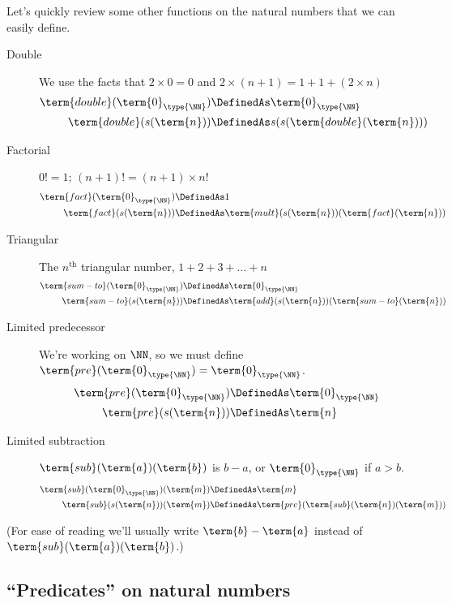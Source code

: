 Let's quickly review some other functions on the natural numbers that we can easily define.
\begin{description}
\item[Double] We use the facts that $2\times 0 = 0$ and $2\times (n+1) = 1+1+(2\times n)$
\begin{align*}
\term{double}(\term{0}_{\type{\NN}}) 
&\DefinedAs 
\term{0}_{\type{\NN}}
\\
\term{double}(s(\term{n})) 
&\DefinedAs
s(s(\term{double}(\term{n})))
\end{align*}
%
\item[Factorial]  $0! = 1$; $(n+1)! = (n+1) \times n!$
\begin{align*}
\term{fact}(\term{0}_{\type{\NN}}) 
&\DefinedAs 
1\\
\term{fact}(s(\term{n})) 
&\DefinedAs
\term{mult}(s(\term{n}))(\term{fact}(\term{n}))
\end{align*}
%
\item[Triangular] The $n^{\mbox{th}}$ triangular number, $1+2+3+ \ldots +n$
\begin{align*}
\term{sum-to}(\term{0}_{\type{\NN}}) 
&\DefinedAs 
\term{0}_{\type{\NN}}
\\
\term{sum-to}(s(\term{n})) 
&\DefinedAs
\term{add}(s(\term{n}))(\term{sum-to}(\term{n}))
\end{align*}
%



\item[Limited predecessor]  We're working on $\NN$, so we must define $\term{pre}(\term{0}_{\type{\NN}})  = \term{0}_{\type{\NN}}$.
 \begin{align*}
\term{pre}(\term{0}_{\type{\NN}}) 
&\DefinedAs 
\term{0}_{\type{\NN}}
\\
\term{pre}(s(\term{n})) 
&\DefinedAs
\term{n}
\end{align*}
%
\item[Limited subtraction]  $\term{sub}(\term{a})(\term{b})$ is $b-a$, or $\term{0}_{\type{\NN}}$ if $a > b$.
 \begin{align*}
\term{sub}(\term{0}_{\type{\NN}})(\term{m}) &\DefinedAs 
\term{m}
\\
\term{sub}(s(\term{n}))(\term{m}) &\DefinedAs
\term{pre}(\term{sub}(\term{n})(\term{m}))
\end{align*}
\end{description}
(For ease of reading we'll usually write $\term{b} - \term{a}$ instead of $\term{sub}(\term{a})(\term{b})$.)


\subsection{``Predicates'' on natural numbers}
\label{sec:NaturalNumbers-PredicatesOnN}

